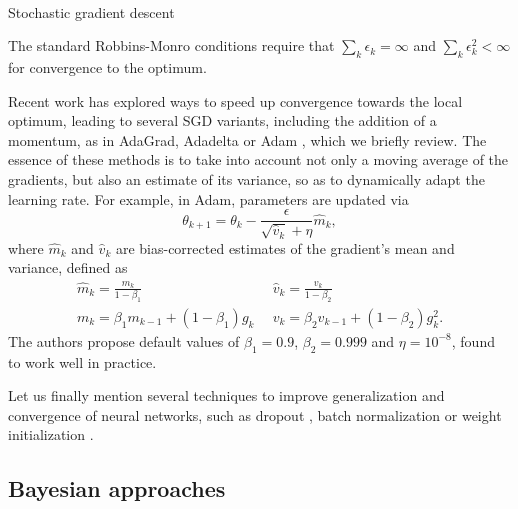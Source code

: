 {\tt
\begin{algorithm}[H]
 \caption{Stochastic gradient descent}\label{alg:sgd}
\end{algorithm}
}
\noindent The standard Robbins-Monro conditions require
that $\sum _k \epsilon_k = \infty$ and 
$\sum _k \epsilon _k^2 < \infty $ for convergence to the optimum.

Recent work has explored ways to 
speed up convergence towards the local optimum, 
leading to several SGD variants, including the 
 addition of a momentum, as in AdaGrad, Adadelta or Adam \cite{kingma2014adam}, which we briefly review. The essence of these methods is to take into account not only a moving average of the gradients, but also an estimate of its variance, so as to dynamically adapt the learning rate. For example, in Adam, 
  parameters are updated via 
$$
\theta_{k+1} = \theta_k - \frac{\epsilon}{\sqrt{\hat{v}_k} + \eta} \hat{m}_k,
$$
where $\hat{m}_k$ and $\hat{v}_k$ are bias-corrected estimates of the gradient's mean and variance, defined as
\begin{align*}
    \hat{m}_k = \frac{m_k}{1 - \beta_{1}} &  \,\,\, \hat{v}_k = \frac{v_k}{1 - \beta_{2}} \\
    m_k = \beta_1 m_{k-1} + (1 - \beta_1)g_k &  \,\,\, v_k = \beta_2 v_{k-1} + (1 - \beta_2)g_k^2.
\end{align*}
The authors propose default values of $\beta_1 = 0.9$, $\beta_2 = 0.999$ and $\eta = 10^{-8}$, found to work well in practice.


Let us finally mention 
several techniques to improve generalization and convergence of neural networks, such as dropout \cite{srivastava2014dropout}, batch normalization \cite{ioffe2015batch} or weight initialization \cite{glorot2010understanding}.


\subsection{Bayesian approaches}

